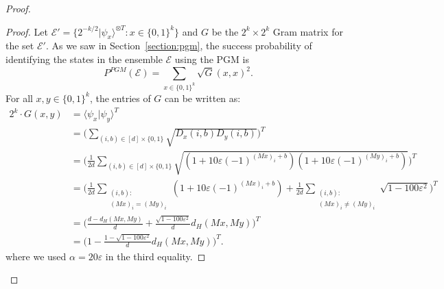 \documentclass[twoside,11pt]{article}
\newcommand{\eps}{\varepsilon}
\newcommand{\ket}[1]{|#1\rangle}
\newcommand{\ip}[2]{\langle #1 | #2 \rangle}
\newcommand{\E}{\mathcal{E}}
\def\01{\{0,1\}}
\begin{document}
\begin{proof}
	\begin{proof}
		Let $\E'=\{2^{-k/2}\ket{\psi_{x}}^{\otimes T}:x\in \01^k\}$ and $G$ be the $2^k\times 2^k$ Gram matrix for the set $\E'$. As we saw in Section~\ref{section:pgm}, the success probability of identifying the states in the ensemble $\E$ using the PGM is
		$$
		P^{PGM}(\E)=\sum_{x\in \01^k} \sqrt{G}({x,x})^2.
		$$
		For all $x,y\in \01^k$, the entries of $G$ can be written as:
		\begin{align*}
		2^k\cdot G(x,y)&=\ip{\psi_{x}}{\psi_{y}}^T\\
		&=\Big(\sum_{(i,b)\in [d]\times \01} \sqrt{D_x(i,b)D_y(i,b)}\Big)^T\\ 	%
		&=\Big(\frac{1}{2d}\sum_{(i,b)\in [d]\times \01} \sqrt{(1+10\eps(-1)^{(Mx)_i+b})(1+10\eps(-1)^{(My)_i+b})}\Big)^T \\
		&=\Big(\frac{1}{2d}\sum_{\substack{(i,b):\\ (Mx)_i=(My)_i}} (1+10\eps(-1)^{(Mx)_i+b})+\frac{1}{2d}\sum_{\substack{(i,b):\\(Mx)_i\neq (My)_i}} \sqrt{1-100\eps^2}\Big)^T\\
		&=\Big(\frac{d-d_H(Mx,My)}{d}+\frac{\sqrt{1-100\eps^2}}{d}d_H(Mx,My)\Big)^T\\
		&=\Big(1-\frac{1-\sqrt{1-100\eps^2}}{d}d_H(Mx,My)\Big)^T.
		\end{align*}
		where we used $\alpha=20\eps$ in the third equality.
		

\end{proof}
\end{proof}
\end{document}
